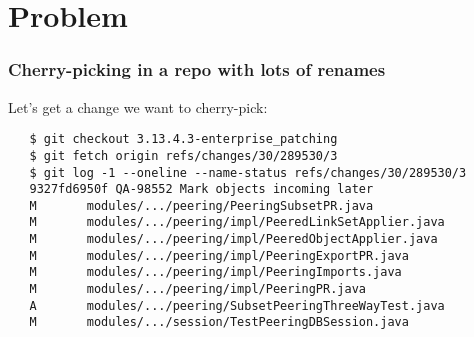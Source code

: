 \documentclass[t]{beamer}
\begin{document}
\section{Problem}
\begin{frame}[containsverbatim]
  \frametitle{Cherry-picking in a repo with lots of renames}

  Let's get a change we want to cherry-pick:

  {\footnotesize
  \begin{verbatim}
   $ git checkout 3.13.4.3-enterprise_patching
   $ git fetch origin refs/changes/30/289530/3
   $ git log -1 --oneline --name-status refs/changes/30/289530/3
   9327fd6950f QA-98552 Mark objects incoming later
   M       modules/.../peering/PeeringSubsetPR.java
   M       modules/.../peering/impl/PeeredLinkSetApplier.java
   M       modules/.../peering/impl/PeeredObjectApplier.java
   M       modules/.../peering/impl/PeeringExportPR.java
   M       modules/.../peering/impl/PeeringImports.java
   M       modules/.../peering/impl/PeeringPR.java
   A       modules/.../peering/SubsetPeeringThreeWayTest.java
   M       modules/.../session/TestPeeringDBSession.java
  \end{verbatim}
  }

\end{frame}

\end{document}
